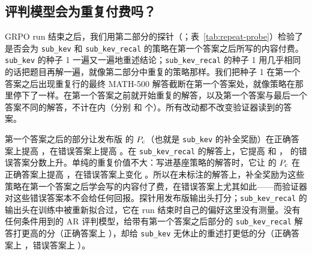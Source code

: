 \subsection{评判模型会为重复付费吗？}\label{sec:res-repeat}

GRPO run 结束之后，我们用第二部分的探针（；表~\ref{tab:repeat-probe}）检验了 \kev{} 是否会为 \texttt{sub\_kev} 和 \texttt{sub\_kev\_recal} 的策略在第一个答案之后所写的内容付费。\texttt{sub\_kev} 的种子 1 一遍又一遍地重述结论；\texttt{sub\_kev\_recal} 的种子 1 用几乎相同的话把题目再解一遍，就像第二部分中重复的策略那样。我们把种子 1 在第一个答案之后出现重复行的最终 MATH-500 解答截断在第一个答案处，就像策略在那里停下了一样。在第一个答案之前就开始重复的解答，以及第一个答案与最后一个答案不同的解答，不计在内（分别  和  个）。所有改动都不改变验证器读到的答案。

第一个答案之后的部分让发布版 \kev{} 的 $\pc$（也就是 \texttt{sub\_kev} 的补全奖励）在正确答案上提高  ，在错误答案上提高  。在 \texttt{sub\_kev\_recal} 的解答上，它提高   和  ， 的错误答案分数上升。单纯的重复价值不大：写进基座策略的解答时，它让 \kev{} 的 $\pc$ 在正确答案上提高 ，在错误答案上变化 。所以在未标注的解答上，补全奖励为这些策略在第一个答案之后学会写的内容付了费，在错误答案上尤其如此——而验证器对这些错误答案本不会给任何回报。探针用发布版输出头打分；\texttt{sub\_kev\_recal} 的输出头在训练中被重新拟合过，它在 run 结束时自己的偏好这里没有测量。没有任何条件用到的 AR 评判模型，给带有第一个答案之后部分的 \texttt{sub\_kev\_recal} 解答打更高的分（正确答案上 ），却给 \texttt{sub\_kev} 无休止的重述打更低的分（正确答案上 ，错误答案上 ）。

\begin{table}[t]
\centering\small\setlength{\tabcolsep}{5pt}

\caption{重复对评判模型值多少（第二部分的探针）：P（有重复）减 P（无重复），分别在验证器判为正确（right）和错误（wrong）的解答上，附各自的数量。上：第二部分判断研究中基座策略的解答，加入重复。下：种子 1 中含重复行的最终 MATH-500 解答，原样对比在第一个答案之后截断。发布版 \kev{} 的 $\pc$ 和 $\pg$ 以及 AR 评判模型的 $P_{\mathrm{a}}$；正文中的区间按题目重采样。}
\label{tab:repeat-probe}
\end{table}
